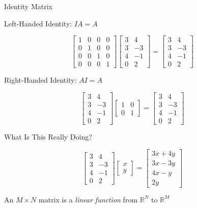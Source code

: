 \documentclass{beamer}
\begin{document}
\begin{frame}{Identity Matrix}

Left-Handed Identity: $IA = A$

\[ \left[ \begin{array}{cccc} 1 & 0 & 0 & 0 \\ 0 & 1 & 0 & 0 \\ 0 & 0 & 1 & 0 \\ 0 & 0 & 0 & 1 \end{array} \right] \left[ \begin{array}{cc} 3 & 4  \\ 3 & -3  \\ 4 & -1  \\  0 & 2  \end{array} \right] = \left[ \begin{array}{cc} 3 & 4  \\ 3 & -3  \\ 4 & -1  \\  0 & 2  \end{array} \right]   \]



Right-Handed Identity: $AI = A$

\[ \left[ \begin{array}{cc} 3 & 4  \\ 3 & -3  \\ 4 & -1  \\  0 & 2  \end{array} \right] \left[ \begin{array}{cc} 1 & 0  \\ 0 & 1 \end{array} \right] = \left[ \begin{array}{cc} 3 & 4  \\ 3 & -3  \\ 4 & -1  \\  0 & 2  \end{array} \right] \]


\end{frame}


\begin{frame}{What Is This Really Doing?}

\[ \left[ \begin{array}{cc} 3 & 4  \\ 3 & -3  \\ 4 & -1  \\  0 & 2  \end{array} \right]  \left[ \begin{array}{c} x  \\ y \end{array} \right]   =  \left[ \begin{array}{c} 3x + 4y  \\ 3x - 3y  \\ 4x - y  \\ 2y \end{array} \right]  \]

An $M \times N$ matrix is a {\em linear function} from $\mathbb{R}^N$ to $\mathbb{R}^M$

\end{frame}
\end{document}
